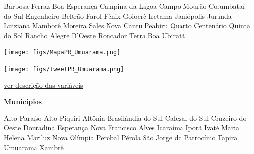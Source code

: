 \documentclass[10pt]{article} %
\begin{document}
\begin{minipage}[t]{.30\linewidth}
\begin{mdframed}[style=sidebar,frametitle={}]
\begin{itemize}
\gsquare Barbosa Ferraz 
\gsquare Boa Esperança 
\gsquare Campina da Lagoa 
\gsquare Campo Mourão 
\gsquare Corumbataí do Sul 
\gsquare Engenheiro Beltrão 
\gsquare Farol 
\gsquare Fênix 
\gsquare Goioerê 
\gsquare Iretama 
\gsquare Janiópolis 
\gsquare Juranda 
\gsquare Luiziana 
\gsquare Mamborê 
\gsquare Moreira Sales 
\gsquare Nova Cantu 
\gsquare Peabiru 
\gsquare Quarto Centenário 
\gsquare Quinta do Sol 
\gsquare Rancho Alegre D'Oeste 
\gsquare Roncador 
\gsquare Terra Boa 
\gsquare Ubiratã 
\end{itemize}\BackToContents\end{mdframed}\hfill\end{minipage}\newpage\begin{minipage}[t]{.66\linewidth}
\hypertarget{Umrm}{}
\texttt{[image: figs/MapaPR\_Umuarama.png]}\vspace{0.5cm}\vspace{0.5cm}\begin{center}
\texttt{[image: figs/tweetPR\_Umuarama.png]}\end{center}
\begin{center}

\end{center}
\small{\hyperlink{vartab}{ver descrição das variáveis}}\end{minipage}\hfill\begin{minipage}[t]{.30\linewidth}
\begin{mdframed}[style=sidebar,frametitle={}]
\textbf{\hyperlink{municips}{Municipios}}\begin{itemize}\gsquare Alto Paraíso 
\gsquare Alto Piquiri 
\gsquare Altônia 
\gsquare Brasilândia do Sul 
\gsquare Cafezal do Sul 
\gsquare Cruzeiro do Oeste 
\gsquare Douradina 
\gsquare Esperança Nova 
\gsquare Francisco Alves 
\gsquare Icaraíma 
\gsquare Iporã 
\gsquare Ivaté 
\gsquare Maria Helena 
\gsquare Mariluz 
\gsquare Nova Olímpia 
\gsquare Perobal 
\gsquare Pérola 
\gsquare São Jorge do Patrocínio 
\gsquare Tapira 
\gsquare Umuarama 
\gsquare Xambrê 
\end{itemize}\BackToContents\end{mdframed}\hfill\end{minipage}\newpage\begin{minipage}[t]{.66\linewidth}
\hypertarget{Cnrt}{}

\end{minipage}
\end{document}
